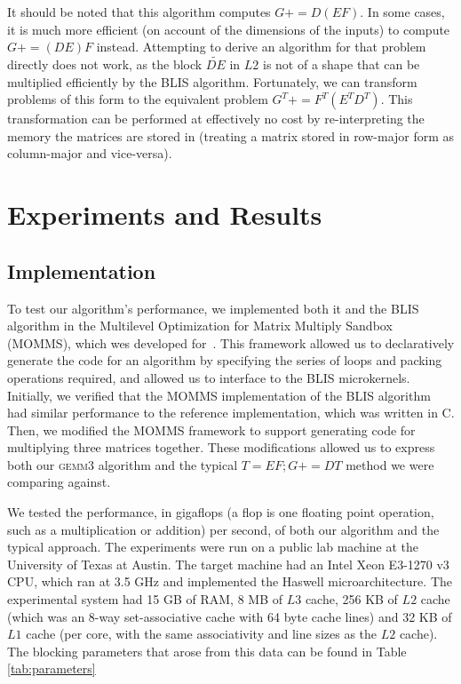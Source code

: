 \documentclass[12pt]{article}
\newcommand*{\pluseq}{\mathrel{{+}{=}}}
\newcommand*{\gemmt}{{\textsc{gemm3}}}
\newcommand*{\mycite}[1]{~\cite{#1}}
\begin{document}
It should be noted that this algorithm computes $G \pluseq D(EF)$.
In some cases, it is much more efficient (on account of the dimensions of the inputs) to compute $G \pluseq (DE)F$ instead.
Attempting to derive an algorithm for that problem directly does not work, as the block $\widetilde{DE}$ in $L2$ is not of a shape that can be multiplied efficiently by the BLIS algorithm.
Fortunately, we can transform problems of this form to the equivalent problem $G^T \pluseq F^T(E^TD^T)$.
This transformation can be performed at effectively no cost by re-interpreting the memory the matrices are stored in (treating a matrix stored in row-major form as column-major and vice-versa).

\section{Experiments and Results}
\subsection{Implementation}
To test our algorithm's performance, we implemented both it and the BLIS algorithm in the Multilevel Optimization for Matrix Multiply Sandbox (MOMMS), which wes developed for\mycite{SmithDiss2017}.
This framework allowed us to declaratively generate the code for an algorithm by specifying the series of loops and packing operations required, and allowed us to interface to the BLIS microkernels.
Initially, we verified that the MOMMS implementation of the BLIS algorithm had similar performance to the reference implementation, which was written in C.
Then, we modified the MOMMS framework to support generating code for multiplying three matrices together.
These modifications allowed us to express both our \gemmt{} algorithm and the typical $T = EF; G \pluseq DT$ method we were comparing against.

We tested the performance, in gigaflops (a flop is one floating point operation, such as a multiplication or addition) per second, of both our algorithm and the typical approach.
The experiments were run on a public lab machine at the University of Texas at Austin.
The target machine had an Intel Xeon E3-1270 v3 CPU, which ran at 3.5 GHz and implemented the Haswell microarchitecture.
The experimental system had 15 GB of RAM, 8 MB of $L3$ cache, 256 KB of $L2$ cache (which was an 8-way set-associative cache with 64 byte cache lines) and 32 KB of $L1$ cache (per core, with the same associativity and line sizes as the $L2$ cache).
The blocking parameters that arose from this data can be found in Table \ref{tab:parameters}
\end{document}
